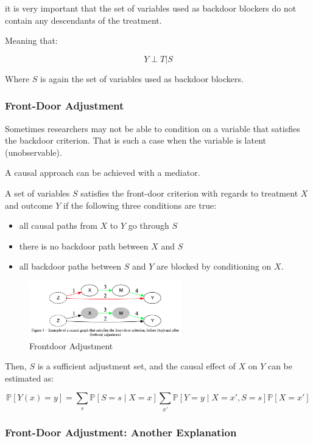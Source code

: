 \documentclass{article}
\begin{document}
it is very important that the set of variables used as backdoor blockers do not contain any descendants of the treatment.

Meaning that:

$$
Y \perp T | S
$$

Where $S$ is again the set of variables used as backdoor blockers.

\subsubsection{Front-Door Adjustment}

Sometimes researchers may not be able to condition on a variable that satisfies the backdoor criterion. That is such a case when the variable is latent (unobservable).

A causal approach can be achieved with a mediator.

A set of variables $S$ satisfies the front-door criterion with regards to treatment $X$ and outcome $Y$ if the following three conditions are true:

\begin{itemize}
  \item all causal paths from $X$ to $Y$ go through $S$
   \item there is no backdoor path between $X$ and $S$
  \item all backdoor paths between $S$ and $Y$ are blocked by conditioning on $X$.
\end{itemize}

\begin{figure}[H]
  \centering
  \includegraphics[width=250px]{draft-photos/frontdoor_adjustment.png}
  \caption{Frontdoor Adjustment}
  \label{fig:frontdoor_adjustment}
\end{figure}

Then, $S$ is a sufficient adjustment set, and the causal effect of $X$ on $Y$ can be
estimated as:

$$
\mathbb{P}[Y(x) = y] = \sum_s \mathbb{P}[S = s \mid X = x] \sum_{x'} \mathbb{P}[Y = y \mid X = x', S = s] \mathbb{P}[X = x']
$$

\subsubsection{Front-Door Adjustment: Another Explanation}
\end{document}
